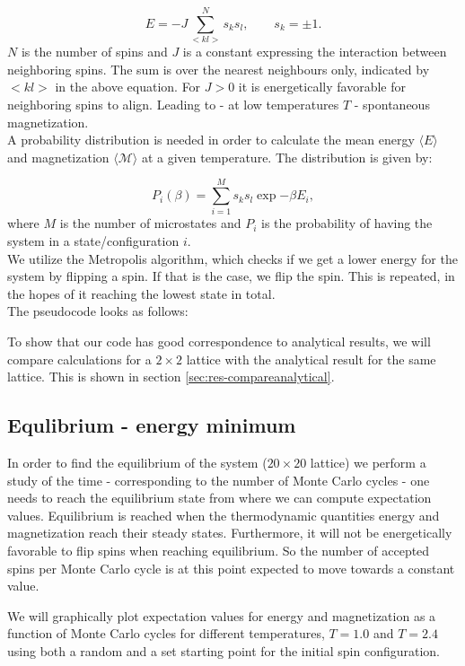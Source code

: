 \documentclass[../main.tex]{subfiles}
\begin{document}
\begin{equation}
  E = -J \sum  _{<kl>}^N s_ks_l,\qquad s_k = \pm 1.
\end{equation}
$N$ is the number of spins and $J$ is a constant expressing the interaction between neighboring spins. The sum is over the nearest neighbours only, indicated by $<kl>$ in the above equation. For $J>0$ it is energetically favorable for neighboring spins to align. Leading to - at low temperatures $T$ - spontaneous magnetization.\\
A probability distribution is needed in order to calculate the mean energy $\langle E \rangle$ and magnetization $\langle \mathcal M \rangle$ at a given temperature. The distribution is given by:

\begin{equation}
  P_i(\beta)=  \sum  _{i = 1}^M s_ks_l \exp{-\beta E_i},
\end{equation}
where $M$ is the number of microstates and $P_i$ is the probability of having the system in a state/configuration $i$.\\
We utilize the Metropolis algorithm, which checks if we get a lower energy for the system by flipping a spin. If that is the case, we flip the spin. This is repeated, in the hopes of it reaching the lowest state in total. \\
The pseudocode looks as follows:


To show that our code has good correspondence to analytical results, we will compare calculations for a $2 \times 2$ lattice with the analytical result for the same lattice. This is shown in section \ref{sec:res-compareanalytical}.

\subsection{Equlibrium - energy minimum}
In order to find the equilibrium of the system ($20\times 20$ lattice) we perform a study of the time - corresponding to the number of Monte Carlo cycles - one needs to reach the equilibrium state from where we can compute expectation values. Equilibrium is reached when the thermodynamic quantities energy and magnetization reach their steady states. Furthermore, it will not be energetically favorable to flip spins when reaching equilibrium. So the number of accepted spins per Monte Carlo cycle is at this point expected to move towards a constant value.

\noindent We will graphically plot expectation values for energy and magnetization as a function of Monte Carlo cycles for different temperatures, $T=1.0$ and $T= 2.4$ using both a random and a set starting point for the initial spin configuration.
\end{document}
